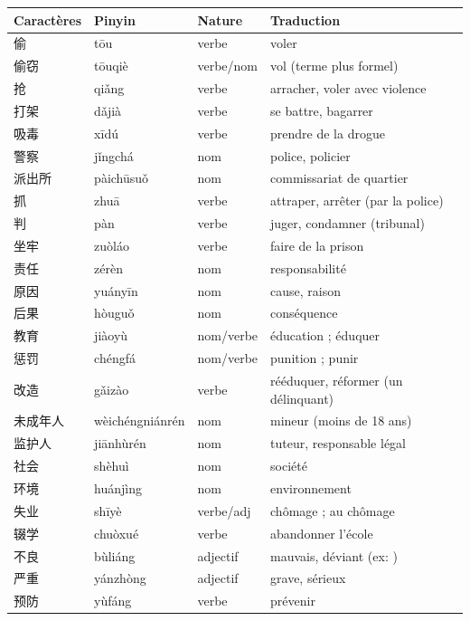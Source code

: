 \documentclass[11pt]{article}
\newcommand{\zh}[1]{\ifmmode\text{#1}\else{#1}\fi}
\begin{document}
\begin{center}
\begin{tabularx}{\linewidth}{|X|X|X|X|}
\hline
\rowcolor{popblueL} Caractères & Pinyin & Nature & Traduction \\
\hline
偷 & tōu & verbe & voler \\
\hline
偷窃 & tōuqiè & verbe/nom & vol (terme plus formel) \\
\hline
抢 & qiǎng & verbe & arracher, voler avec violence \\
\hline
打架 & dǎjià & verbe & se battre, bagarrer \\
\hline
吸毒 & xīdú & verbe & prendre de la drogue \\
\hline
警察 & jǐngchá & nom & police, policier \\
\hline
派出所 & pàichūsuǒ & nom & commissariat de quartier \\
\hline
抓 & zhuā & verbe & attraper, arrêter (par la police) \\
\hline
判 & pàn & verbe & juger, condamner (tribunal) \\
\hline
坐牢 & zuòláo & verbe & faire de la prison \\
\hline
责任 & zérèn & nom & responsabilité \\
\hline
原因 & yuányīn & nom & cause, raison \\
\hline
后果 & hòuguǒ & nom & conséquence \\
\hline
教育 & jiàoyù & nom/verbe & éducation ; éduquer \\
\hline
惩罚 & chéngfá & nom/verbe & punition ; punir \\
\hline
改造 & gǎizào & verbe & rééduquer, réformer (un délinquant) \\
\hline
未成年人 & wèichéngniánrén & nom & mineur (moins de 18 ans) \\
\hline
监护人 & jiānhùrén & nom & tuteur, responsable légal \\
\hline
社会 & shèhuì & nom & société \\
\hline
环境 & huánjìng & nom & environnement \\
\hline
失业 & shīyè & verbe/adj & chômage ; au chômage \\
\hline
辍学 & chuòxué & verbe & abandonner l'école \\
\hline
不良 & bùliáng & adjectif & mauvais, déviant (ex: \zh{不良少年}) \\
\hline
严重 & yánzhòng & adjectif & grave, sérieux \\
\hline
预防 & yùfáng & verbe & prévenir \\
\hline
\end{tabularx}
\end{center}
\end{document}
